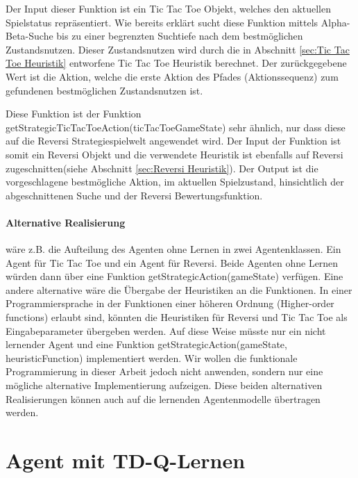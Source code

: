 Der Input dieser Funktion ist ein Tic Tac Toe Objekt, welches den aktuellen Spielstatus repräsentiert. Wie bereits erklärt sucht diese Funktion mittels Alpha-Beta-Suche bis zu einer begrenzten Suchtiefe nach dem bestmöglichen Zustandsnutzen. Dieser Zustandsnutzen wird durch die in Abschnitt \ref{sec:Tic Tac Toe Heuristik} entworfene Tic Tac Toe Heuristik berechnet. Der zurückgegebene Wert ist die Aktion, welche die erste Aktion des Pfades (Aktionssequenz) zum gefundenen bestmöglichen Zustandsnutzen ist.  

Diese Funktion ist der Funktion getStrategicTicTacToeAction(ticTacToeGameState) sehr ähnlich, nur dass diese auf die Reversi Strategiespielwelt angewendet wird. Der Input der Funktion ist somit ein Reversi Objekt und die verwendete Heuristik ist ebenfalls auf Reversi zugeschnitten(siehe Abschnitt \ref{sec:Reversi Heuristik}). Der Output ist die vorgeschlagene bestmögliche Aktion, im aktuellen Spielzustand, hinsichtlich der abgeschnittenen Suche und der Reversi Bewertungsfunktion.

\paragraph{Alternative Realisierung} wäre z.B. die Aufteilung des Agenten ohne Lernen in zwei Agentenklassen. Ein Agent für Tic Tac Toe und ein Agent für Reversi. Beide Agenten ohne Lernen würden dann über eine Funktion getStrategicAction(gameState) verfügen. Eine andere alternative wäre die Übergabe der Heuristiken an die Funktionen. In einer Programmiersprache in der Funktionen einer höheren Ordnung (Higher-order functions) erlaubt sind, könnten die Heuristiken für Reversi und Tic Tac Toe als Eingabeparameter übergeben werden. Auf diese Weise müsste nur ein nicht lernender Agent und eine Funktion getStrategicAction(gameState, heuristicFunction) implementiert werden. Wir wollen die funktionale Programmierung in dieser Arbeit jedoch nicht anwenden, sondern nur eine mögliche alternative Implementierung aufzeigen. Diese beiden alternativen Realisierungen können auch auf die lernenden Agentenmodelle übertragen werden.

\section{Agent mit TD-Q-Lernen}


